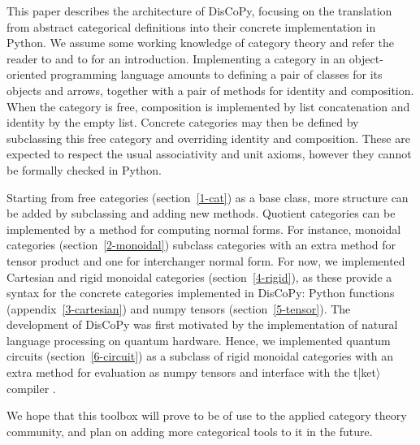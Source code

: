 This paper describes the architecture of DisCoPy, focusing on the translation from abstract categorical definitions into their concrete implementation in Python.
We assume some working knowledge of category theory and refer the reader to \cite{Lane98} and to \cite{Awodey06} for an introduction.
Implementing a category in an object-oriented programming language amounts to defining a pair of classes for its objects and arrows, together with a pair of methods for identity and composition.
When the category is free, composition is implemented by list concatenation and identity by the empty list.
Concrete categories may then be defined by subclassing this free category and overriding identity and composition.
These are expected to respect the usual associativity and unit axioms, however they cannot be formally checked in Python.

Starting from free categories (section~\ref{1-cat}) as a base class, more structure can be added by subclassing and adding new methods.
Quotient categories can be implemented by a method for computing normal forms.
For instance, monoidal categories (section~\ref{2-monoidal}) subclass categories with an extra method for tensor product and one for interchanger normal form.
For now, we implemented Cartesian and rigid monoidal categories (section~\ref{4-rigid}), as these provide a syntax for the concrete categories implemented in DisCoPy: Python functions (appendix~\ref{3-cartesian}) and numpy \cite{VanderWaltEtAl11} tensors (section~\ref{5-tensor}).
The development of DisCoPy was first motivated by the implementation of natural language processing on quantum hardware.
Hence, we implemented quantum circuits (section~\ref{6-circuit}) as a subclass of rigid monoidal categories with an extra method for evaluation as numpy tensors and interface with the t|ket$\rangle$ compiler \cite{SivarajahEtAl20}.

We hope that this toolbox will prove to be of use to the applied category theory community, and plan on adding more categorical tools to it in the future.
